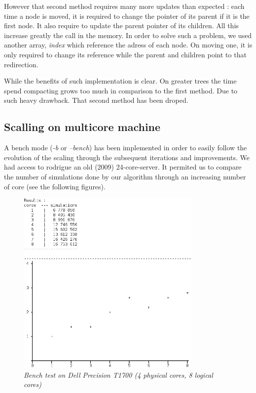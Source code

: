 However that second method requires many more updates than expected : 
each time a node is moved, it is required to change the pointer of its parent if it is the first node. It also require to update the parent pointer of its children. All this increase greatly the call in the memory. In order to solve such a problem, we used another array, \textit{index} which reference the adress of each node. On moving one, it is only required to change its reference while the parent and children point to that redirection.

While the benefits of such implementation is clear. On greater trees the time spend compacting grows too much in comparison to the first method. Due to such heavy drawback. That second method has been droped.

\subsection{Scalling on multicore machine}

A bench mode (\textit{-b} or \textit{--bench}) has been implemented in order to easily follow the evolution of the scaling through the subsequent iterations and improvements. We had access to rodrigue an old (2009) 24-core-server. It permited us to compare the number of simulations done by our algorithm through an increasing number of core (see the following figures).

\begin{figure}[H] 
\centerline{\includegraphics[width=0.8\textwidth]{Optimisations/bench_T1700.png}}
\caption{\label{fig:Defrag}\textit{Bench test on Dell Precision T1700 (4 physical cores, 8 logical cores)}}
\end{figure}

